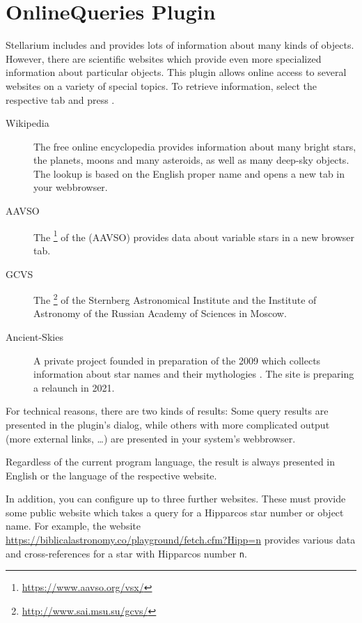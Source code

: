 \newpage
\section{OnlineQueries Plugin}
\label{sec:plugins:OnlineQueries}

Stellarium includes and provides lots of information about many kinds
of objects. However, there are scientific websites which provide even
more specialized information about particular objects. This plugin
 allows online access to several websites on a
variety of special topics. To retrieve information, select the
respective tab and press .

\begin{description}
\item[Wikipedia] The free online encyclopedia provides information
  about many bright stars, the planets, moons and many asteroids, as
  well as many deep-sky objects. The lookup is based on the English
  proper name and opens a new tab in your webbrowser.
\item[AAVSO] The \footnote{\url{https://www.aavso.org/vsx/}} of the
   (AAVSO)
  provides data about variable stars in a new browser tab.
\item[GCVS] The \footnote{\url{http://www.sai.msu.su/gcvs/}} of the Sternberg
  Astronomical Institute and the Institute of Astronomy of the Russian
  Academy of Sciences in Moscow.
\item[Ancient-Skies] A private project founded in preparation of the
   2009 which collects
  information about star names and their mythologies
  \citep{AncientSkies:2011}. The site is preparing a relaunch in 2021.
\end{description}

\noindent For technical reasons, there are two kinds of results: Some
query results are presented in the plugin's dialog, while others with
more complicated output (more external links, \ldots) are presented in
your system's webbrowser.

Regardless of the current program language, the result is always
presented in English or the language of the respective website.

In addition, you can configure up to three further websites. These
must provide some public website which takes a query for a Hipparcos
star number or object name.  For example, the website
\url{https://biblicalastronomy.co/playground/fetch.cfm?Hipp=n}
provides various data and cross-references for a star with Hipparcos
number \texttt{n}.

